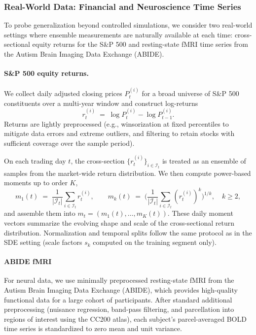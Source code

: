 \documentclass[journal, onecolumn]{IEEEtran}
\begin{document}
\subsubsection{Real-World Data: Financial and Neuroscience Time Series}

To probe generalization beyond controlled simulations, we consider two real-world
settings where ensemble measurements are naturally available at each time: cross-sectional
equity returns for the S\&P 500 and resting-state fMRI time series from the
Autism Brain Imaging Data Exchange (ABIDE).

\paragraph{S\&P 500 equity returns.}
We collect daily adjusted closing prices $P_t^{(i)}$ for a broad universe of
S\&P 500 constituents over a multi-year window and construct log-returns
\[
r_t^{(i)} \;=\; \log P_t^{(i)} - \log P_{t-1}^{(i)}.
\]
Returns are lightly preprocessed (e.g., winsorization at fixed percentiles to mitigate
data errors and extreme outliers, and filtering to retain stocks with sufficient
coverage over the sample period).

On each trading day $t$, the cross-section $\{r_t^{(i)}\}_{i \in \mathcal{I}_t}$ is
treated as an ensemble of samples from the market-wide return distribution. We then
compute power-based moments up to order $K$,
\[
m_1(t) \;=\; \frac{1}{|\mathcal{I}_t|} \sum_{i \in \mathcal{I}_t} r_t^{(i)},
\qquad
m_k(t) \;=\; \Big( \frac{1}{|\mathcal{I}_t|} \sum_{i \in \mathcal{I}_t} (r_t^{(i)})^k \Big)^{1/k},
\quad k \ge 2,
\]
and assemble them into $m_t = (m_1(t),\dots,m_K(t))$.
These daily moment vectors summarize the evolving shape and scale of the
cross-sectional return distribution. Normalization and temporal splits follow the
same protocol as in the SDE setting (scale factors $s_k$ computed on the training
segment only).

\paragraph{ABIDE fMRI}
For neural data, we use minimally preprocessed resting-state fMRI from the Autism
Brain Imaging Data Exchange (ABIDE), which provides high-quality functional data for a large
cohort of participants. After standard additional preprocessing (nuisance regression,
band-pass filtering, and parcellation into regions of interest using the CC200 atlas), each subject's
parcel-averaged BOLD time series is standardized to zero mean and unit variance.
\end{document}
